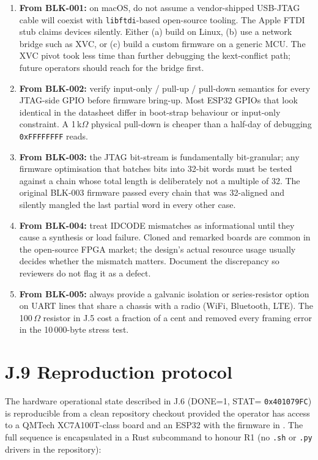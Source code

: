 \begin{enumerate}
  \item \textbf{From BLK-001:} on macOS, do not assume a vendor-shipped
    USB-JTAG cable will coexist with \texttt{libftdi}-based open-source
    tooling. The Apple FTDI stub claims devices silently. Either (a) build
    on Linux, (b) use a network bridge such as XVC, or (c) build a
    custom firmware on a generic MCU. The XVC pivot took less time than
    further debugging the kext-conflict path; future operators should
    reach for the bridge first.
  \item \textbf{From BLK-002:} verify input-only / pull-up / pull-down
    semantics for every JTAG-side GPIO before firmware bring-up. Most
    ESP32 GPIOs that look identical in the datasheet differ in
    boot-strap behaviour or input-only constraint. A 1\,k$\Omega$
    physical pull-down is cheaper than a half-day of debugging
    \texttt{0xFFFFFFFF} reads.
  \item \textbf{From BLK-003:} the JTAG bit-stream is fundamentally
    bit-granular; any firmware optimisation that batches bits into 32-bit
    words must be tested against a chain whose total length is
    deliberately not a multiple of 32. The original BLK-003 firmware
    passed every chain that was 32-aligned and silently mangled the
    last partial word in every other case.
  \item \textbf{From BLK-004:} treat IDCODE mismatches as informational
    until they cause a synthesis or load failure. Cloned and remarked
    boards are common in the open-source FPGA market; the design's
    actual resource usage usually decides whether the mismatch matters.
    Document the discrepancy so reviewers do not flag it as a defect.
  \item \textbf{From BLK-005:} always provide a galvanic isolation or
    series-resistor option on UART lines that share a chassis with a
    radio (WiFi, Bluetooth, LTE). The 100\,$\Omega$ resistor in J.5 cost
    a fraction of a cent and removed every framing error in the
    10\,000-byte stress test.
\end{enumerate}

\section*{J.9 Reproduction protocol}
\label{sec:appJ-reproduction}

The hardware operational state described in J.6 (DONE=1, STAT=
\texttt{0x401079FC}) is reproducible from a clean repository checkout
provided the operator has access to a QMTech XC7A100T-class board and an
ESP32 with the firmware in . The full
sequence is encapsulated in a Rust subcommand to honour R1 (no \texttt{.sh}
or \texttt{.py} drivers in the repository):

